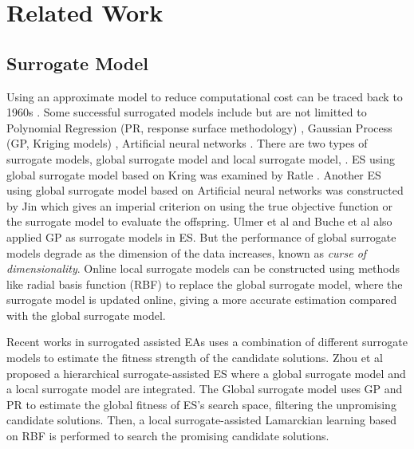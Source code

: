 




\section{Related Work}

\subsection{Surrogate Model} 

Using an approximate model to reduce computational cost can be traced back to 1960s \cite{Dunham1963}. Some successful surrogated models include but are not limitted to Polynomial Regression (PR, response surface methodology) \cite{doi:10.1080/00401706.1966.10490404}, Gaussian Process (GP, Kriging models) \cite{sacks1989}, Artificial neural networks \cite{Smith:1993:NNS:583180}. There are two types of surrogate models, global surrogate model and local surrogate model, . ES using global surrogate model based on Kring was examined by Ratle \cite{Ratle:2001:KSF:966173.966177}. Another ES using global surrogate model based on Artificial neural networks was constructed by Jin \cite{Jin02aframework} which gives an imperial criterion on using the true objective function or the surrogate model to evaluate the offspring. Ulmer et al \cite{Ulmer03evolutionstrategies} and Buche et al \cite{1424193} also applied GP as surrogate models in ES. But the performance of global surrogate models degrade as the dimension of the data increases, known as \textit{curse of dimensionality}. Online local surrogate models \cite{4033013} can be constructed using methods like radial basis function (RBF) \cite{GIANNAKOGLOU200243} to replace the global surrogate model, where the surrogate model is updated online, giving a more accurate estimation compared with the global surrogate model.


Recent works in surrogated assisted EAs uses a combination of different surrogate models to estimate the fitness strength of the candidate solutions. Zhou et al \cite{4033013} proposed a hierarchical surrogate-assisted ES where a global surrogate model and a local surrogate model are integrated. The Global surrogate model uses GP and PR to estimate the global fitness of ES's search space, filtering the unpromising candidate solutions. Then, a local surrogate-assisted Lamarckian learning based on RBF is performed to search the promising candidate solutions. 


